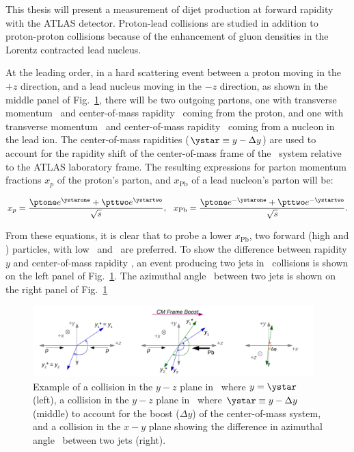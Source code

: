 This thesis will present a  measurement of dijet production at forward rapidity with the ATLAS detector. Proton-lead collisions are studied in addition to proton-proton collisions because of the enhancement of gluon densities in the Lorentz contracted lead nucleus.


At the leading order, in a hard scattering event between a proton moving in the $+z$ direction, and a lead nucleus moving in the $-z$ direction, as shown in the middle panel of Fig.~\ref{fig:yandystar}, there will be two outgoing partons, one with transverse momentum \ptone\ and center-of-mass rapidity \ystarone\ coming from the proton, and one with transverse momentum \pttwo\ and center-of-mass rapidity \ystartwo\ coming from a nucleon in the lead ion. The center-of-mass rapidities ($\ystar \equiv y - \Delta y$) are used to account for the rapidity shift of the center-of-mass frame of the \pPb\ system relative to the ATLAS laboratory frame. The resulting expressions for parton momentum fractions $x_{p}$ of the proton's parton, and $x_{\mathrm{Pb}}$ of a lead nucleon's parton will be:

\begin{equation}
x_{p}=\frac{\ptone e^{\ystarone}+\pttwo e^{\ystartwo}}{\sqrt{s}}, \ \ x_{\mathrm{Pb}}=\frac{\ptone e^{-\ystarone}+\pttwo e^{-\ystartwo}}{\sqrt{s}}.
\label{eqn:x1x2}
\end{equation}

From these equations, it is clear that to probe a lower $x_{\mathrm{Pb}}$, two forward (high \ystarone and \ystartwo) particles, with low \ptone\ and \pttwo\ are preferred. To show the difference between rapidity $y$ and center-of-mass rapidity \ystar, an event producing two jets in \pp\ collisions is shown on the left panel of Fig.~\ref{fig:yandystar}. The azimuthal angle \Dphi\ between two jets is shown on the right panel of  Fig.~\ref{fig:yandystar}

\begin{figure}
	\centering
	\includegraphics[width=0.970\textwidth]{figures/collision_system.pdf} 
	\caption{Example of a collision in the $y-z$ plane in \pp\ where $y=\ystar$ (left), a collision in the $y-z$ plane in \pPb\ where $\ystar \equiv y - \Delta y$ (middle) to account for the boost ($\Delta y$) of the center-of-mass system, and a collision in the $x-y$ plane showing the difference in azimuthal angle \Dphi\ between two jets (right). }	
	\label{fig:yandystar}
\end{figure}

